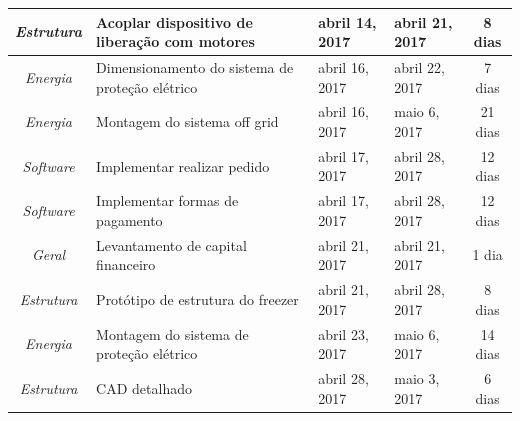 \begin{longtable}{|c|m{6.5cm}|m{3.2cm}|m{3.2cm}|c|}
\textit{Estrutura}                                                        & Acoplar dispositivo de liberação com motores         & abril 14, 2017                       & abril 21, 2017                    & 8 dias                                \\ \hline
\textit{Energia}                                                          & Dimensionamento do sistema de proteção elétrico      & abril 16, 2017                       & abril 22, 2017                    & 7 dias                                \\ \hline
\textit{Energia}                                                          & Montagem do sistema off grid                         & abril 16, 2017                       & maio 6, 2017                      & 21 dias                               \\ \hline
\textit{Software}                                                         & Implementar realizar pedido                          & abril 17, 2017                       & abril 28, 2017                    & 12 dias                               \\ \hline
\textit{Software}                                                         & Implementar formas de pagamento                      & abril 17, 2017                       & abril 28, 2017                    & 12 dias                               \\ \hline
\textit{Geral}                                                            & Levantamento de capital financeiro                   & abril 21, 2017                       & abril 21, 2017                    & 1 dia                                 \\ \hline
\textit{Estrutura}                                                        & Protótipo de estrutura do freezer                    & abril 21, 2017                       & abril 28, 2017                    & 8 dias                                \\ \hline
\textit{Energia}                                                          & Montagem do sistema de proteção elétrico             & abril 23, 2017                       & maio 6, 2017                      & 14 dias                               \\ \hline
\textit{Estrutura}                                                        & CAD detalhado                                        & abril 28, 2017                       & maio 3, 2017                      & 6 dias                                \\ \hline

\end{longtable}
